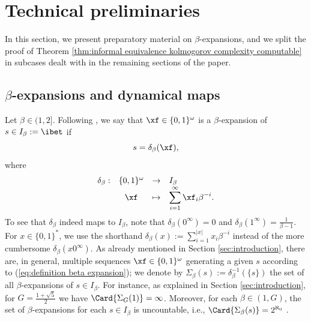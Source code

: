 
\section{Technical preliminaries}
\label{sec:notations formal result}



In this section, we present preparatory material on $\beta$-expansions, and we split the proof of Theorem \ref{thm:informal equivalence kolmogorov complexity computable} in subcases dealt with in the remaining sections of the paper.
\subsection{\texorpdfstring{$\beta$-expansions}{-expansions} and dynamical maps}
\noindent Let $\beta \in (1,2]$. Following \cite{parry1960beta}, we say that $\xf \in \{0,1\}^\omega$ is a $\beta$-expansion of 
$s \in I_\beta := \ibet$ if
\begin{equation}\label{eq:definition beta expansion}
	s = \delta_\beta(\xf),
\end{equation}
where 
\begin{equation}\label{eq:definition of delta beta}
	\begin{array}{lccl}
		\delta_\beta : & \{0,1\}^\omega & \to & I_\beta\\
		& \xf & \mapsto & \displaystyle \sum_{i=1}^{\infty} \xf_i \beta^{-i}.
	\end{array}
\end{equation}
To see that $\delta_\beta$ indeed maps to $I_\beta$, note that $\delta_\beta(0^\infty) = 0$ and $\delta_\beta(1^\infty) = \frac{1}{\beta-1}$. For $x \in \{0,1\}^\ast$, we use the shorthand $\delta_\beta(x):= \sum_{i=1}^{|x|}x_i\beta^{-i}$ instead of the more cumbersome $\delta_\beta(x0^\infty)$. As already mentioned in Section \ref{sec:introduction}, there are, in general, multiple sequences $\xf \in \{0,1\}^\omega$ generating a given $s$ according to (\ref{eq:definition beta expansion}); we denote by $\Sigma_\beta(s) := \delta_\beta^{-1}(\{s\})$ the set of all $\beta$-expansions of $s \in I_\beta$. For instance, as explained in Section \ref{sec:introduction}, for $G = \frac{1 + \sqrt{5}}{2}$ we have $\Card{\Sigma_G(1)} = \infty$. Moreover, for each $\beta \in (1,G)$, the set of $\beta$-expansions for each $s \in I_\beta$ is uncountable, i.e., $\Card{\Sigma_\beta(s)} = 2^{\aleph_0}$ \cite[Theorem 3]{erdos1990characterization}. 

